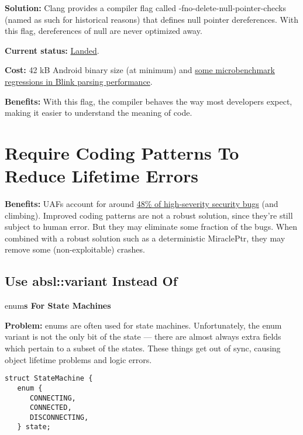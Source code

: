 \documentclass[a4paper,12pt,notitlepage,twoside,openright]{article}
\newcommand{\uline}[1]{#1}
\begin{document}
{\textbf{Solution:} Clang provides a compiler flag
called -fno-delete-null-pointer-checks (named as such for historical
reasons) that defines null pointer dereferences. With this flag,
dereferences of null are never optimized away.

\textbf{Current
status:} \href{https://www.google.com/url?q=https://chromium-review.googlesource.com/c/chromium/src/\%2B/2481465\&sa=D\&source=editors\&ust=1631944129072000\&usg=AOvVaw1TiZFMeA5sgo2qoM3LqftV}{\uline{Landed}}.

\textbf{Cost: }42 kB Android binary size (at minimum)
and \href{https://www.google.com/url?q=https://crbug.com/1149340\&sa=D\&source=editors\&ust=1631944129072000\&usg=AOvVaw2VVH7EMtibHKBKRTY50Qwe}{\uline{some
microbenchmark regressions in Blink parsing performance}}.

\textbf{Benefits:} With this flag, the compiler behaves the way most
developers expect, making it easier to understand the meaning of code.

\section{Require Coding Patterns To Reduce Lifetime Errors}

\textbf{Benefits:} UAFs account for
around \href{https://docs.google.com/document/d/e/2PACX-1vRZr-HJcYmf2Y76DhewaiJOhRNpjGHCxliAQTBhFxzv1QTae9o8mhBmDl32CRIuaWZLt5kVeH9e9jXv/pub\#h.eoikp3r0cwlf}{\uline{48\%
of high-severity security bugs}} (and climbing). Improved coding
patterns are not a robust solution, since they're still subject to human
error. But they may eliminate some fraction of the bugs. When combined
with a robust solution such as a deterministic MiraclePtr, they may
remove some (non-exploitable) crashes.

\subsection{Use absl::variant Instead Of }enum\textbf{s For State Machines}

\textbf{Problem:} enums are often used for state machines.
Unfortunately, the enum variant is not the only bit of the state ---
there are almost always extra fields which pertain to a subset of the
states. These things get out of sync, causing object lifetime problems
and logic errors.

\begin{verbatim}
struct StateMachine {
   enum {
      CONNECTING,
      CONNECTED,
      DISCONNECTING,
   } state;


\end{verbatim}}
\end{document}
